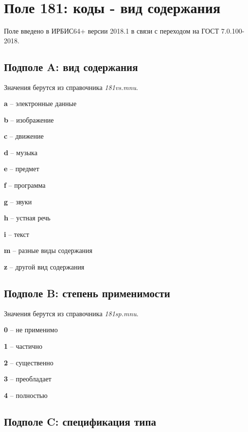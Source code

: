 \chapter{Поле 181: коды - вид содержания}

Поле введено в ИРБИС64+ версии 2018.1 в связи с переходом на ГОСТ 7.0.100-2018.

\section{Подполе A: вид содержания}

Значения берутся из справочника \emph{181vs.mnu}.

\begin{cutelist}
    \item \textbf{a} -- электронные данные
    \item \textbf{b} -- изображение
    \item \textbf{c} -- движение
    \item \textbf{d} -- музыка
    \item \textbf{e} -- предмет
    \item \textbf{f} -- программа
    \item \textbf{g} -- звуки
    \item \textbf{h} -- устная речь
    \item \textbf{i} -- текст
    \item \textbf{m} -- разные виды содержания
    \item \textbf{z} -- другой вид содержания
\end{cutelist}

\section{Подполе B: степень применимости}

Значения берутся из справочника \emph{181sp.mnu}.

\begin{cutelist}
    \item \textbf{0} -- не применимо
    \item \textbf{1} -- частично
    \item \textbf{2} -- существенно
    \item \textbf{3} -- преобладает
    \item \textbf{4} -- полностью
\end{cutelist}

\section{Подполе C: спецификация типа}

